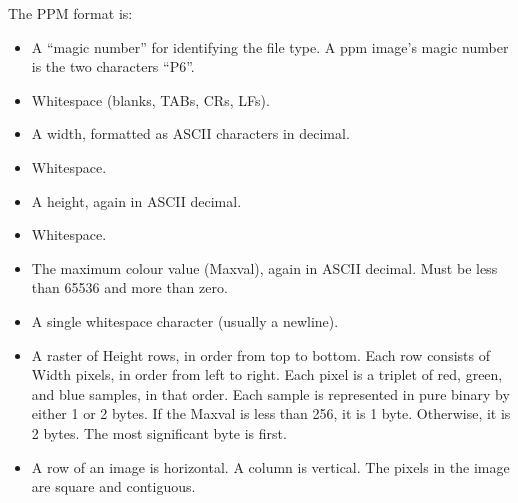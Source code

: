 \documentclass{article}
\begin{document}
        The PPM format is:
        \begin{itemize}
            \item A ``magic number'' for identifying the file type. A ppm image's magic number is the two characters ``P6''.
            \item Whitespace (blanks, TABs, CRs, LFs).
            \item A width, formatted as ASCII characters in decimal.
            \item Whitespace.
            \item A height, again in ASCII decimal.
            \item Whitespace.
            \item The maximum colour value (Maxval), again in ASCII decimal. Must be less than 65536 and more than zero.
            \item A single whitespace character (usually a newline).
            \item A raster of Height rows, in order from top to bottom. Each row consists of Width pixels, in order from left to right.
            Each pixel is a triplet of red, green, and blue samples, in that order. Each sample is represented in pure binary by either 1
            or 2 bytes. If the Maxval is less than 256, it is 1 byte. Otherwise, it is 2 bytes. The most significant byte is first.
            \item A row of an image is horizontal. A column is vertical. The pixels in the image are square and contiguous.
        \end{itemize}
        
\end{document}

